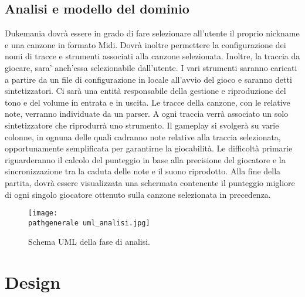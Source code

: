 \documentclass[a4paper,12pt]{report}
\newcommand\pathgenerale{img/generali/}
\begin{document}
\section{Analisi e modello del dominio}


Dukemania dovrà essere in grado di fare selezionare all'utente il proprio nickname e una canzone in formato Midi. Dovrà inoltre permettere la configurazione dei nomi di tracce e strumenti associati alla canzone selezionata. Inoltre, la traccia da giocare, sara' anch'essa selezionabile dall'utente.
I vari strumenti saranno caricati a partire da un file di configurazione in locale all'avvio del gioco e saranno detti sintetizzatori.
Ci sarà una entità responsabile della gestione e riproduzione del tono e del volume in entrata e in uscita. Le tracce della canzone, con le relative note, verranno individuate da un parser. A ogni traccia verrà associato un solo sintetizzatore che riprodurrà uno strumento.
Il gameplay si svolgerà su varie colonne, in ognuna delle quali cadranno note relative alla traccia selezionata, opportunamente semplificata per garantirne la giocabilità.
Le difficoltà primarie riguarderanno il calcolo del punteggio in base alla precisione del giocatore e la sincronizzazione tra la caduta delle note e il suono riprodotto.
Alla fine della partita, dovrà essere visualizzata una schermata contenente il punteggio migliore di ogni singolo giocatore ottenuto sulla canzone selezionata in precedenza.
\begin{figure}[!htb]
	\centerline{\texttt{[image: \\pathgenerale uml\_analisi.jpg]}}
	\caption{Schema UML della fase di analisi.}
	\label{img:analysis}
\end{figure}
\newpage


\chapter{Design}
\end{document}
